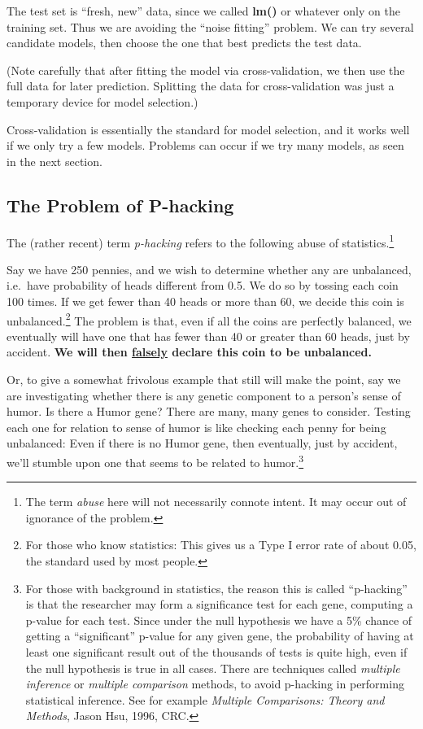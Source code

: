 The test set is ``fresh, new'' data, since we called \textbf{lm()} or
whatever only on the training set.  Thus we are avoiding the ``noise
fitting'' problem.  We can try several candidate models, then choose the
one that best predicts the test data.

(Note carefully that after fitting the model via cross-validation, we
then use the full data for later prediction.  Splitting the data for
cross-validation was just a temporary device for model selection.)

Cross-validation is essentially the standard for model selection, and it
works well if we only try a few models.  Problems can occur if we try
many models, as seen in the next section.

\subsection{The Problem of P-hacking}

The (rather recent) term \textit{p-hacking} refers to the following
abuse of statistics.\footnote{The term \textit{abuse} here will not
necessarily connote intent. It may occur out of ignorance of the
problem.}

Say we have 250 pennies, and we wish to determine whether any are
unbalanced, i.e.\ have probability of heads different from 0.5.  We do
so by tossing each coin 100 times.  If we get fewer than 40 heads or
more than 60, we decide this coin is unbalanced.\footnote{For those who
know statistics:  This gives us a Type I error rate of about 0.05, the
standard used by most people.}  The problem is that, even if all the
coins are perfectly balanced, we eventually will have one that has fewer
than 40 or greater than 60 heads, just by accident.  \textbf{We will
then \underline{falsely} declare this coin to be unbalanced.}

Or, to give a somewhat frivolous example that still will make the point,
say we are investigating whether there is any genetic component to a
person's sense of humor.  Is there a Humor gene?  There are many, many
genes to consider.  Testing each one for relation to sense of humor is
like checking each penny for being unbalanced: Even if there is no Humor
gene, then eventually, just by accident, we'll stumble upon one that
seems to be related to humor.\footnote{For those with background in
statistics, the reason this is called ``p-hacking'' is that the
researcher may form a significance test for each gene, computing a
p-value for each test.  Since under the null hypothesis we have a 5\%
chance of getting a ``significant'' p-value for any given gene, the
probability of having at least one significant result out of the
thousands of tests is quite high, even if the null hypothesis is true in
all cases.  There are techniques called \textit{multiple inference} or
\textit{multiple comparison} methods, to avoid p-hacking in performing
statistical inference.  See for example \textit{Multiple Comparisons:
Theory and Methods}, Jason Hsu, 1996, CRC.}

